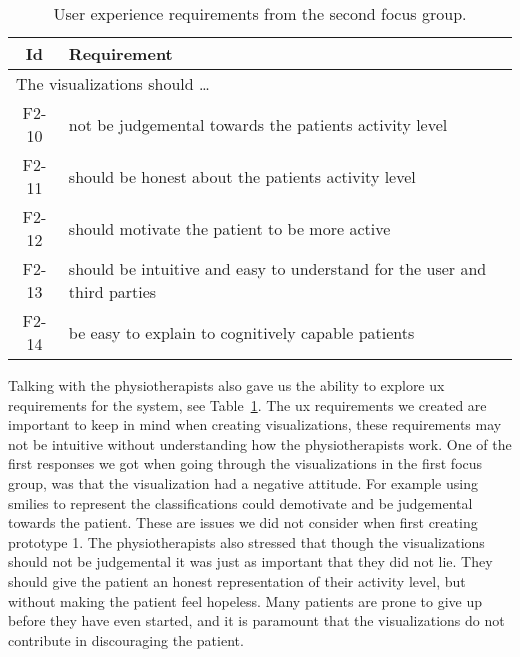 \begin{table}[h!]
  \begin{center}
  \begin{tabular}{|c|p{12cm}|}
    \hline
      \textbf{Id} & \textbf{Requirement} \\ \hline
    \multicolumn{2}{|l|}{The visualizations should \ldots} \\ \hline
      F2-10 & not be judgemental towards the patients activity level \\ \hline
      F2-11 & should be honest about the patients activity level \\ \hline
      F2-12 & should motivate the patient to be more active \\ \hline
      F2-13 & should be intuitive and easy to understand for the user and third parties \\ \hline
      F2-14 & be easy to explain to cognitively capable patients \\ \hline
  \end{tabular}
  \end{center}
  \caption{User experience requirements from the second focus group.}
  \label{tab:f2ReqUx}
\end{table}

Talking with the physiotherapists also gave us the ability to explore \gls{ux} requirements for the system, see Table~\ref{tab:f2ReqUx}. The \gls{ux} requirements we created are important to keep in mind when creating visualizations, these requirements may not be intuitive without understanding how the physiotherapists work. One of the first responses we got when going through the visualizations in the first focus group, was that the visualization had a negative attitude. For example using smilies to represent the classifications could demotivate and be judgemental towards the patient. These are issues we did not consider when first creating prototype 1. The physiotherapists also stressed that though the visualizations should not be judgemental it was just as important that they did not lie. They should give the patient an honest representation of their activity level, but without making the patient feel hopeless. Many patients are prone to give up before they have even started, and it is paramount that the visualizations do not contribute in discouraging the patient.

